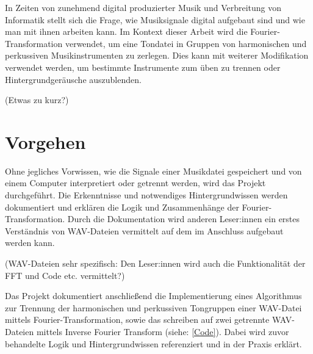 \par

In Zeiten von zunehmend digital produzierter Musik und Verbreitung von Informatik stellt sich die Frage, wie Musiksignale digital aufgebaut sind und wie man mit ihnen arbeiten kann. Im Kontext dieser Arbeit wird die Fourier-Transformation verwendet, um eine Tondatei in Gruppen von harmonischen und perkussiven Musikinstrumenten zu zerlegen. Dies kann mit weiterer Modifikation verwendet werden, um bestimmte Instrumente zum üben zu trennen oder Hintergrundgeräusche auszublenden.

\par


(Etwas zu kurz?)

%
\section{Vorgehen}
%

Ohne jegliches Vorwissen, wie die Signale einer Musikdatei gespeichert und von einem Computer interpretiert oder getrennt werden, wird das Projekt durchgeführt. Die Erkenntnisse und notwendiges Hintergrundwissen werden dokumentiert und erklären die Logik und Zusammenhänge der Fourier-Transformation. Durch die Dokumentation wird anderen Leser:innen ein erstes Verständnis von WAV-Dateien vermittelt auf dem im Anschluss aufgebaut werden kann.

\par

(WAV-Dateien sehr spezifisch: Den Leser:innen wird auch die Funktionalität der FFT und Code etc. vermittelt?)

\par

Das Projekt dokumentiert anschließend die Implementierung eines Algorithmus zur Trennung der harmonischen und perkussiven Tongruppen einer WAV-Datei mittels Fourier-Transformation, sowie das schreiben auf zwei getrennte WAV-Dateien mittels Inverse Fourier Transform (siehe: \cref{Code}). Dabei wird zuvor behandelte Logik und Hintergrundwissen referenziert und in der Praxis erklärt.